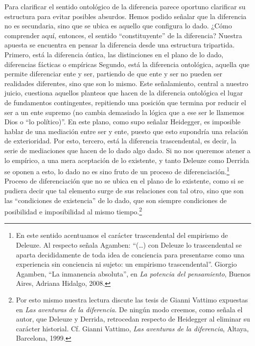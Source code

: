 Para clarificar el sentido ontológico de la diferencia parece oportuno
clarificar su estructura para evitar posibles absurdos. Hemos podido
señalar que la diferencia no es secundaria, sino que se ubica es aquello
que configura lo dado. ¿Cómo comprender aquí, entonces, el sentido
\enquote{constituyente} de la diferencia? Nuestra apuesta se encuentra en pensar
la diferencia desde una estructura tripartida. Primero, está la
diferencia óntica, las distinciones en el plano de lo dado, diferencias
fácticas o empíricas Segundo, está la diferencia ontológica, aquella que
permite diferenciar ente y ser, partiendo de que ente y ser no pueden
ser realidades diferentes, sino que son lo mismo. Este señalamiento,
central a nuestro juicio, cuestiona aquellos planteos que hacen de la
diferencia ontológica el lugar de fundamentos contingentes, repitiendo
una posición que termina por reducir el ser a un ente supremo (no cambia
demasiado la lógica que a ese ser le llamemos Dios o \enquote{lo político)}. En
este plano, como supo señalar Heidegger, es imposible hablar de una
mediación entre ser y ente, puesto que esto supondría una relación de
exterioridad. Por esto, tercero, está la diferencia trascendental, es
decir, la serie de mediaciones que hacen de lo dado algo dado. Si no nos
queremos atener a lo empírico, a una mera aceptación de lo existente, y
tanto Deleuze como Derrida se oponen a esto, lo dado no es sino fruto de
un proceso de diferenciación.\footnote{En este sentido acentuamos el
  carácter trascendental del empirismo de Deleuze. Al respecto señala
  Agamben: \enquote{(\dots) con Deleuze lo trascendental se aparta
  decididamente de toda idea de conciencia para presentarse como una
  experiencia sin conciencia ni sujeto: un empirismo trascendental}.
  Giorgio Agamben, \enquote{La inmanencia absoluta}, en \emph{La potencia del
  pensamiento}, Buenos Aires, Adriana Hidalgo, 2008.} Proceso de
diferenciación que no se ubica en el plano de lo existente, como si se
pudiera decir que tal elemento surge de sus relaciones con tal otro,
sino que son las \enquote{condiciones de existencia} de lo dado, que son siempre
condiciones de posibilidad e imposibilidad al mismo tiempo.\footnote{Por
  esto mismo nuestra lectura discute las tesis de Gianni Vattimo
  expuestas en \emph{Las aventuras de la diferencia}. De ningún modo
  creemos, como señala el autor, que Deleuze y Derrida, retrocedan
  respecto de Heidegger al eliminar su carácter historial. Cf. Gianni
  Vattimo, \emph{Las aventuras de la diferencia}, Altaya, Barcelona,
  1999.}

